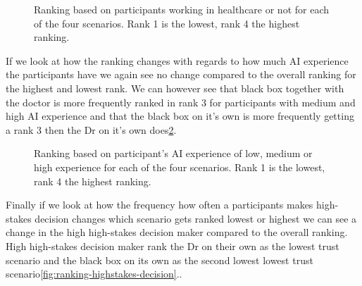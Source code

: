 \documentclass[manuscript,screen,review]{acmart}
\begin{document}
\begin{figure}[h]
    \caption{Ranking based on participants working in healthcare or not for each of the four scenarios. Rank 1 is the lowest, rank 4 the highest ranking.}
    \label{fig:ranking-healthcare}
\end{figure}

If we look at how the ranking changes with regards to how much AI experience the participants have we again see no change compared to the overall ranking for the highest and lowest rank. We can however see that black box together with the doctor is more frequently ranked in rank 3 for participants with medium and high AI experience and that the black box on it's own is more frequently getting a rank 3 then the Dr on it's own does\ref{fig:ranking-ai}.

\begin{figure}[h]
    \caption{Ranking based on participant's AI experience of low, medium or high experience for each of the four scenarios. Rank 1 is the lowest, rank 4 the highest ranking.}
    \label{fig:ranking-ai}
\end{figure}

Finally if we look at how the frequency how often a participants makes high-stakes decision changes which scenario gets ranked lowest or highest we can see a change in the high high-stakes decision maker compared to the overall ranking. High high-stakes decision maker rank the Dr on their own as the lowest trust scenario and the black box on its own as the second lowest lowest trust scenario\ref{fig:ranking-highstakes-decision}..
\end{document}
